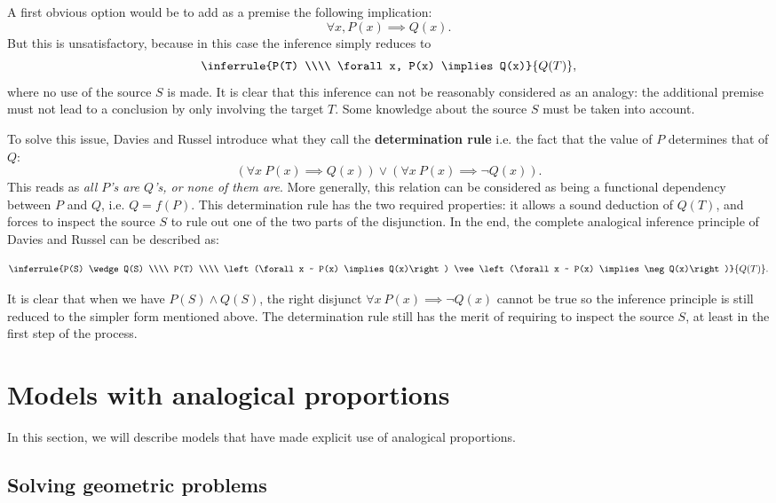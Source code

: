 A first obvious option would be to add as a premise the following implication:
$$\forall x, P(x) \implies Q(x).$$
But this is unsatisfactory, because in this case the inference simply reduces
to
$$\inferrule{P(T) \\\\ \forall x, P(x) \implies Q(x)}{Q(T)},$$ where no use of the
source $S$ is made. It is clear that this inference can not be reasonably
considered as an analogy: the additional premise must not lead to a conclusion
by only involving the target $T$. Some knowledge about the source $S$ must be
taken into account.

To solve this issue, Davies and Russel introduce what they call the
\textbf{determination rule} i.e. the fact that the value of $P$ determines that
of $Q$:
$$\left(\forall x ~ P(x) \implies Q(x)\right) \vee \left(\forall x ~ P(x) \implies
\neg Q(x)\right).$$
This reads as \textit{all $P$'s are $Q$'s, or none of them are}. More
generally, this relation can be considered as being a functional dependency
between $P$ and $Q$, i.e. $Q = f(P)$. This determination rule has the two
required properties: it allows a sound deduction of $Q(T)$, and forces to
inspect the source $S$ to rule out one of the two parts of the
disjunction. In the end, the complete analogical inference principle of Davies
and Russel can be described as:

$$\inferrule{P(S) \wedge Q(S) \\\\ P(T) \\\\  \left(\forall x ~ P(x) \implies
Q(x)\right) \vee \left(\forall x ~ P(x) \implies \neg Q(x)\right)}{Q(T)}.$$

It is clear that when we have $P(S) \wedge Q(S)$, the right disjunct $\forall x
~ P(x) \implies \neg Q(x)$ cannot be true so the inference principle is still
reduced to the simpler form mentioned above. The determination rule still has
the merit of requiring to inspect the source $S$, at least in the first step
of the process.


\section{Models with analogical proportions}
\label{SEC:models_with_analogical_proportions}

In this section, we will describe models that have made explicit use of
analogical proportions.

\subsection{Solving geometric problems}

